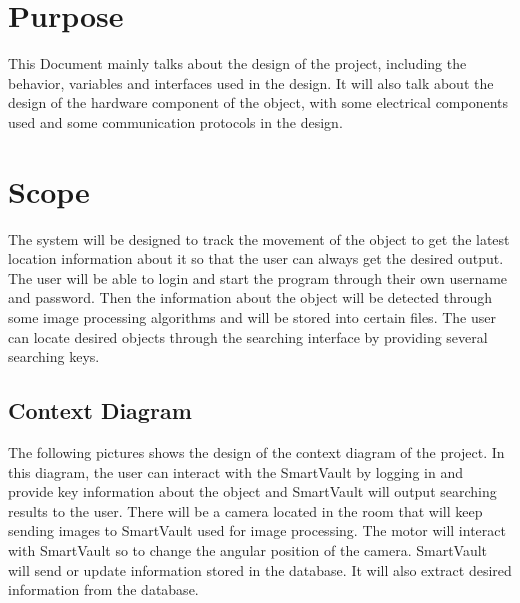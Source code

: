 \documentclass[12pt, titlepage]{article}
\begin{document}
\newpage

\tableofcontents

\newpage

\listoftables

\listoffigures

\newpage



\section{Purpose}

This Document mainly talks about the design of the project, including the behavior, variables and interfaces used in the design. It will also talk about the design of the hardware component of the object, with some electrical components used and some communication protocols in the design.

\section{Scope}

The system will be designed to track the movement of the object to get the latest location information about it so that the user can always get the desired output. The user will be able to login and start the program through their own username and password. Then the information about the object will be detected through some image processing algorithms and will be stored into certain files. The user can locate desired objects through the searching interface by providing several searching keys. 


\subsection{Context Diagram}

The following pictures shows the design of the context diagram of the project. In this diagram, the user can interact with the SmartVault by logging in and provide key information about the object and SmartVault will output searching results to the user. There will be a camera located in the room that will keep sending images to SmartVault used for image processing. The motor will interact with SmartVault so to change the angular position of the camera. SmartVault will send or update information stored in the database. It will also extract desired information from the database. 
\end{document}
